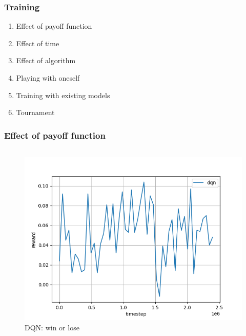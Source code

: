 \begin{frame}
\frametitle{Training}
\begin{enumerate}
\item Effect of payoff function
\item Effect of time
\item Effect of algorithm
\item Playing with oneself
\item Training with existing models
\item Tournament
\end{enumerate}
\end{frame}


\begin{frame}
\frametitle{Effect of payoff function}

\begin{columns}[t]

\begin{column}{.5\textwidth}
\begin{figure}
\includegraphics[height=.5\textheight]{dqn-no-specific-payoff.png}
\caption{DQN: win or lose}
\end{figure}
\end{column}


\end{columns}
\end{frame}
